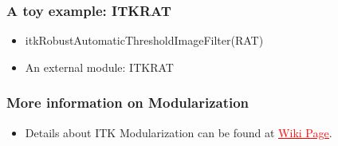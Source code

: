 \begin{frame}
\frametitle{A toy example: ITKRAT}
\begin{itemize}
\item  itkRobustAutomaticThresholdImageFilter(RAT)
\pause
\item  An external module: ITKRAT
\end{itemize}
\end{frame}


\begin{frame}
\frametitle{More information on Modularization}
\begin{itemize}
\item  Details about ITK Modularization can be found at \href{http://www.itk.org/Wiki/ITK\_Release\_4/Modularization}{\textcolor{red}{\underline{Wiki Page}}}.
\end{itemize}
\end{frame}
